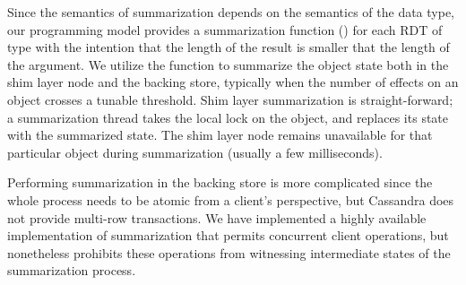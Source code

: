Since the semantics of summarization depends on the semantics of the data type,
our programming model provides a summarization function () for
each RDT of type \cf{[e] -> [e]} with the intention that the length of the
result is smaller that the length of the argument. We utilize the
 function to summarize the object state both in the shim layer
node and the backing store, typically when the number of effects on an object
crosses a tunable threshold. Shim layer summarization is straight-forward; a
summarization thread takes the local lock on the object, and replaces its state
with the summarized state. The shim layer node remains unavailable for that
particular object during summarization (usually a few milliseconds).

Performing summarization in the backing store is more complicated since the whole
process needs to be atomic from a client's perspective, but Cassandra does not
provide multi-row transactions. We have implemented a highly available
implementation of summarization that permits concurrent client operations, but
nonetheless prohibits these operations from witnessing intermediate states of
the summarization process.
